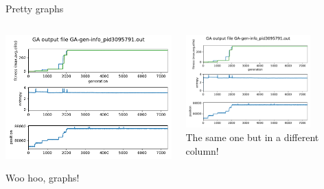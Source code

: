 \documentclass[10pt,aspectratio=169]{beamer}
\begin{document}
\begin{frame}{Pretty graphs}
  \begin{columns} %
    \begin{column}{0.4\textwidth}
      \includegraphics[width=\textwidth]{GA-gen-info_pid3095791.out.pdf}
                      {\tiny Woo hoo, graphs!\par}
    \end{column}

    \begin{column}{0.6\textwidth}
      \includegraphics[width=0.75\textwidth]{GA-gen-info_pid3095791.out.pdf}\\
      				{\tiny The same one but in a different column!}
    \end{column}
  \end{columns}
\end{frame}










\end{document}
